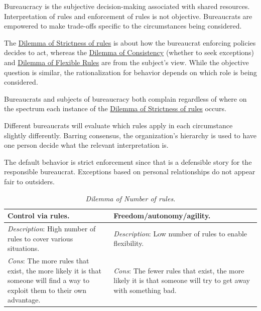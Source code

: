 Bureaucracy is the subjective decision-making associated with shared resources. Interpretation of rules and enforcement of rules is not objective. Bureaucrats are empowered to make trade-offs specific to the circumstances being considered.


The 
\hyperref[table:dilemma-personal-rule-strictness-lax]{Dilemma of Strictness of rules} 
is about how the bureaucrat enforcing policies decides to act, whereas the
\hyperref[table:dilemma-subject-consistency-per-situation]{Dilemma of Consistency} 
(whether to seek exceptions) and
\hyperref[table:dilemma-subject-flexibility]{Dilemma of Flexible Rules}
are from the subject's view. While the objective question is similar, the rationalization for behavior depends on which role is being considered.

Bureaucrats and subjects of bureaucracy both complain regardless of where on the spectrum each instance of the \hyperref[table:dilemma-personal-rule-strictness-lax]{Dilemma of Strictness of rules} occurs. 

Different bureaucrats will evaluate which rules apply in each circumstance slightly differently. Barring consensus, the organization's hierarchy is used to have one person decide what the relevant interpretation is.

The default behavior is strict enforcement since that is a defensible story for the responsible bureaucrat. Exceptions based on personal relationships do not appear fair to outsiders.


\begin{center}
\begin{table}[H] %
\begin{tabular}{ | m{\dilemmatablewidth}| m{\dilemmatablewidth} | } 
  \hline
  \textbf{Control via rules.} & 
  \textbf{Freedom/autonomy/agility.} \\ 
  \hline
  \textit{Description}: High number of rules to cover various situations. & 
  \textit{Description}: Low number of rules to enable flexibility. \\ 
  \hline
  \textit{Cons}: The more rules that exist, the more likely it is that someone will find a way to exploit them to their own advantage. & 
  \textit{Cons}: The fewer rules that exist, the more likely it is that someone will try to get away with something bad. \\  
  \hline
\end{tabular}
\caption{
\textit{Dilemma of Number of rules.}
}
\label{table:dilemma-personal-number-of-rules}
\end{table}
\end{center}



